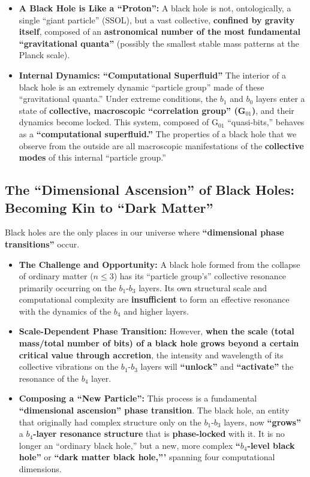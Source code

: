 \documentclass[11pt, a4paper]{article}
\begin{document}
\begin{itemize}
    \item \textbf{A Black Hole is Like a ``Proton'':}
    A black hole is not, ontologically, a single ``giant particle'' (SSOL), but a vast collective, \textbf{confined by gravity itself}, composed of an \textbf{astronomical number of the most fundamental ``gravitational quanta''} (possibly the smallest stable mass patterns at the Planck scale).
    \item \textbf{Internal Dynamics: ``Computational Superfluid''}
    The interior of a black hole is an extremely dynamic ``particle group'' made of these ``gravitational quanta.'' Under extreme conditions, the $b_1$ and $b_0$ layers enter a state of \textbf{collective, macroscopic ``correlation group'' (G$_{01}$)}, and their dynamics become locked. This system, composed of G$_{01}$ ``quasi-bits,'' behaves as a \textbf{``computational superfluid.''} The properties of a black hole that we observe from the outside are all macroscopic manifestations of the \textbf{collective modes} of this internal ``particle group.''
\end{itemize}

\subsection{The ``Dimensional Ascension'' of Black Holes: Becoming Kin to ``Dark Matter''}

Black holes are the only places in our universe where \textbf{``dimensional phase transitions''} occur.

\begin{itemize}
    \item \textbf{The Challenge and Opportunity:}
    A black hole formed from the collapse of ordinary matter ($n \le 3$) has its ``particle group's'' collective resonance primarily occurring on the $b_1$-$b_3$ layers. Its own structural scale and computational complexity are \textbf{insufficient} to form an effective resonance with the dynamics of the $b_4$ and higher layers.
    \item \textbf{Scale-Dependent Phase Transition:}
    However, \textbf{when the scale (total mass/total number of bits) of a black hole grows beyond a certain critical value through accretion}, the intensity and wavelength of its collective vibrations on the $b_1$-$b_3$ layers will \textbf{``unlock''} and \textbf{``activate''} the resonance of the $b_4$ layer.
    \item \textbf{Composing a ``New Particle'':}
    This process is a fundamental \textbf{``dimensional ascension'' phase transition}. The black hole, an entity that originally had complex structure only on the $b_1$-$b_3$ layers, now \textbf{``grows''} a \textbf{$b_4$-layer resonance structure} that is \textbf{phase-locked} with it. It is no longer an ``ordinary black hole,'' but a new, more complex \textbf{``$b_4$-level black hole''} or \textbf{``dark matter black hole,'''} spanning four computational dimensions.
\end{itemize}
\end{document}

